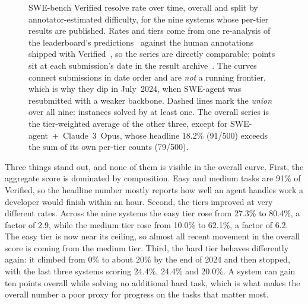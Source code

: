 \documentclass[
  english,        %
  font=times,     %
  twocolumn,      %
]{tumarticle}
\begin{document}
\begin{figure}[t]
  \caption{SWE-bench Verified resolve rate over time, overall and split by
    annotator-estimated difficulty, for the nine systems whose per-tier results are
    published. Rates and tiers come from one re-analysis of the leaderboard's
    predictions~\cite{ganhotra2025difficulty} against the human annotations shipped
    with Verified~\cite{openai2024verified}, so the series are directly comparable;
    points sit at each submission's date in the result
    archive~\cite{swebench_leaderboard}. The curves connect submissions in date
    order and are \emph{not} a running frontier, which is why they dip in
    July~2024, when SWE-agent was resubmitted with a weaker backbone. Dashed lines
    mark the \emph{union} over all nine: instances solved by at least one. The
    overall series is the tier-weighted average of the other three, except for
    SWE-agent~+~Claude~3~Opus, whose headline 18.2\% (91/500) exceeds the sum of
    its own per-tier counts (79/500).}
  \label{fig:swebench-trajectory}
\end{figure}

Three things stand out, and none of them is visible in the overall curve. First,
the aggregate score is dominated by composition. Easy and medium tasks are 91\%
of Verified, so the headline number mostly reports how well an agent handles
work a developer would finish within an hour. Second, the tiers improved at very
different rates. Across the nine systems the easy tier rose from 27.3\% to
80.4\%, a factor of 2.9, while the medium tier rose from 10.0\% to 62.1\%, a
factor of 6.2. The easy tier is now near its ceiling, so almost all recent
movement in the overall score is coming from the medium tier. Third, the hard
tier behaves differently again: it climbed from 0\% to about 20\% by the end of
2024 and then stopped, with the last three systems scoring 24.4\%, 24.4\% and
20.0\%. A system can gain ten points overall while solving no additional hard
task, which is what makes the overall number a poor proxy for progress on the
tasks that matter most.
\end{document}

